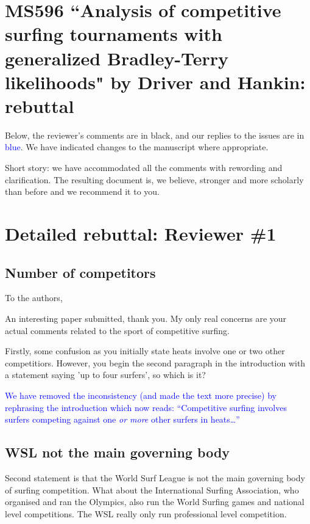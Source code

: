 \documentclass[12pt]{article}
\begin{document}
\section*{MS596 ``Analysis of competitive surfing tournaments with generalized Bradley-Terry likelihoods" by Driver and Hankin: rebuttal}

Below, the reviewer's comments are in black, and our replies to the
issues are in \textcolor{blue}{blue}.  We have indicated changes to
the manuscript where appropriate.

Short story: we have accommodated all the comments with rewording and
clarification.  The resulting document is, we believe, stronger and
more scholarly than before and we recommend it to you.

\section*{Detailed rebuttal: Reviewer \#1}



\subsection*{Number of competitors}

To the authors,

An interesting paper submitted, thank you. My only
real concerns are your actual comments related to the sport of
competitive surfing.

Firstly, some confusion as you initially state heats involve one or
two other competitiors. However, you begin the second paragraph in the
introduction with a statement saying 'up to four surfers', so which is
it?

\textcolor{blue}{We have removed the inconsistency (and made the text
  more precise) by rephrasing the introduction which now reads:
  ``Competitive surfing involves surfers competing against one {\em or
    more} other surfers in heats\ldots''}

\subsection*{WSL not the main governing body}

Second statement is that the World Surf League is not the main
governing body of surfing competition. What about the International
Surfing Association, who organised and ran the Olympics, also run the
World Surfing games and national level competitions. The WSL really
only run professional level competition.
\end{document}
